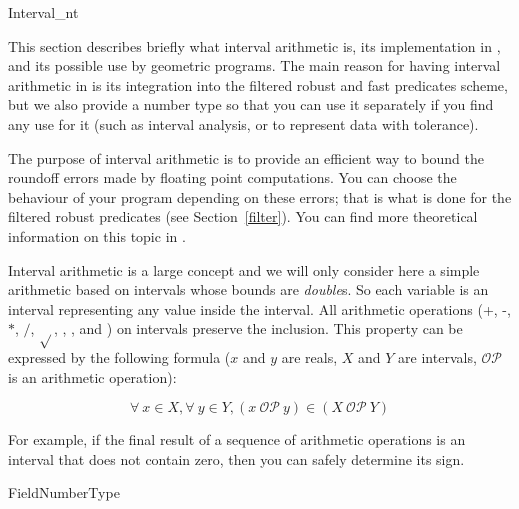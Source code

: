
\begin{ccRefClass}{Interval_nt}
\label{interval}


\ccDefinition

This section describes briefly what interval arithmetic is, its implementation
in {\cgal}, and its possible use by geometric programs.
The main reason for having interval arithmetic in {\cgal} is its integration
into the filtered robust and fast predicates scheme, but we also provide a
number type so that you can use it separately if you find any use for it
(such as interval analysis, or to represent data with tolerance).


The purpose of interval arithmetic is to provide an efficient way to bound
the roundoff errors made by floating point computations.
You can choose the behaviour of your program depending on these errors; that
is what is done for the filtered robust predicates (see Section~\ref{filter}).
You can find more theoretical information on this topic in
\cite{bbp-iayed-01}.

Interval arithmetic is a large concept and we will only consider here a 
simple arithmetic based on intervals whose bounds are {\it double}s.
So each variable is an interval representing any value inside the interval.
All arithmetic operations (+, -, $*$, $/$, $\sqrt{}$, ,
,  and ) on intervals preserve the inclusion.
This property can be expressed by the following formula ($x$ and $y$ are
reals, $X$ and $Y$ are intervals, $\mathcal{OP}$ is an arithmetic operation):

$$
\forall\ x \in X, \forall\ y \in Y, (x\ \mathcal{OP}\ y)
\in (X\ \mathcal{OP}\ Y)
$$

For example, if the final result of a sequence of arithmetic operations is
an interval that does not contain zero, then you can safely determine its sign.


\ccIsModel
FieldNumberType


\end{ccRefClass}
